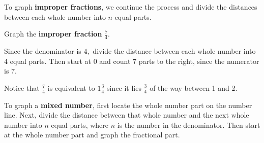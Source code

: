 \documentclass[handout, font=12pt]{ximera}
\begin{document}
To graph \textbf{improper fractions}, we continue the process and divide the distances between each whole number into $n$ equal parts.

\begin{example}

Graph the \textbf{improper fraction} $\textstyle \frac{7}{4}.$ 

\begin{explanation}

Since the denominator is $4,$ divide the distance between each whole number into $4$ equal parts.  Then start at $0$ and count $7$ 
parts to the right, since the numerator is $7.$

\begin{center}

\end{center}

\begin{remark}
Notice that $\frac{7}{4}$ is equivalent to $1 \frac{3}{4}$ since it lies $\frac{3}{4}$ of the way between 1 and 2.
\end{remark}

\end{explanation}
\end{example}

To graph a \textbf{mixed number}, first locate the whole number part on the number line. Next, divide the distance between 
that whole number and the next whole number into $n$ equal parts, where $n$ is the number in the denominator.  Then start 
at the whole number part and graph the fractional part.
\end{document}
